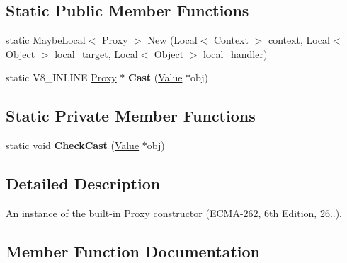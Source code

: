 \subsection*{Static Public Member Functions}
\begin{DoxyCompactItemize}
\item 
static \hyperlink{classv8_1_1_maybe_local}{Maybe\+Local}$<$ \hyperlink{classv8_1_1_proxy}{Proxy} $>$ \hyperlink{classv8_1_1_proxy_ab58d9d98f17d299ca7a487d05e771260}{New} (\hyperlink{classv8_1_1_local}{Local}$<$ \hyperlink{classv8_1_1_context}{Context} $>$ context, \hyperlink{classv8_1_1_local}{Local}$<$ \hyperlink{classv8_1_1_object}{Object} $>$ local\+\_\+target, \hyperlink{classv8_1_1_local}{Local}$<$ \hyperlink{classv8_1_1_object}{Object} $>$ local\+\_\+handler)
\item 
static V8\+\_\+\+I\+N\+L\+I\+NE \hyperlink{classv8_1_1_proxy}{Proxy} $\ast$ {\bfseries Cast} (\hyperlink{classv8_1_1_value}{Value} $\ast$obj)\hypertarget{classv8_1_1_proxy_a6562478fdedab6fa0fe20ede066b2a78}{}\label{classv8_1_1_proxy_a6562478fdedab6fa0fe20ede066b2a78}

\end{DoxyCompactItemize}
\subsection*{Static Private Member Functions}
\begin{DoxyCompactItemize}
\item 
static void {\bfseries Check\+Cast} (\hyperlink{classv8_1_1_value}{Value} $\ast$obj)\hypertarget{classv8_1_1_proxy_a7c64d712828fb25b89c2f319227a2414}{}\label{classv8_1_1_proxy_a7c64d712828fb25b89c2f319227a2414}

\end{DoxyCompactItemize}


\subsection{Detailed Description}
An instance of the built-\/in \hyperlink{classv8_1_1_proxy}{Proxy} constructor (E\+C\+M\+A-\/262, 6th Edition, 26..). 

\subsection{Member Function Documentation}
